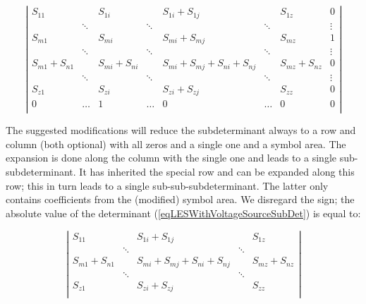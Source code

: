 \begin{equation}
\label{eqLESWithVoltageSourceSubDet}
\left|
\begin{array}{cccccccc}
S_{11}        &        & S_{1i}        &        & S_{1i}+S_{1j}  &        & S_{1z}        & 0      \\
              & \ddots &               & \ddots &                & \ddots &               & \vdots \\
S_{m1}        &        & S_{mi}        &        & S_{mi}+S_{mj}  &        & S_{mz}        & 1      \\
              & \ddots &               & \ddots &                & \ddots &               & \vdots \\
S_{m1}+S_{n1} &        & S_{mi}+S_{ni} &        & S_{mi}+S_{mj}
                                                  +S_{ni}+S_{nj} &        & S_{mz}+S_{nz} & 0      \\
              & \ddots &               & \ddots &                & \ddots &               & \vdots \\
S_{z1}        &        & S_{zi}        &        & S_{zi}+S_{zj}  &        & S_{zz}        & 0      \\
0             & \ldots & 1             & \ldots & 0              & \ldots & 0             & 0      \\
\end{array}
\right|
\end{equation}

The suggested modifications will reduce the subdeterminant always to a row
and column (both optional) with all zeros and a single one and a symbol area.
The expansion is done along the column with the single one and leads to a
single sub-subdeterminant. It has inherited the special row and can be
expanded along this row; this in turn leads to a single
sub-sub-subdeterminant. The latter only contains coefficients from the
(modified) symbol area. We disregard the sign; the absolute value of the
determinant (\ref{eqLESWithVoltageSourceSubDet}) is equal to:

\begin{equation}
\label{eqLESWithVoltageSourceSubDetExpanded}
\left|
\begin{array}{ccccc}
S_{11}        &        & S_{1i}+S_{1j}  &        & S_{1z}        \\
              & \ddots &                & \ddots &               \\
S_{m1}+S_{n1} &        & S_{mi}+S_{mj}
                         +S_{ni}+S_{nj} &        & S_{mz}+S_{nz} \\
              & \ddots &                & \ddots &               \\
S_{z1}        &        & S_{zi}+S_{zj}  &        & S_{zz}        \\
\end{array}
\right|
\end{equation}

